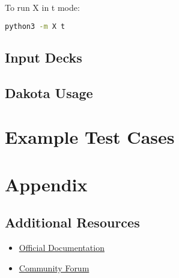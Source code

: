 \documentclass[a4paper,12pt]{article}
\begin{document}
To run X in t mode: 

\vspace{1em}  
\begin{lstlisting}[language=bash]  
    python3 -m X t 
\end{lstlisting}  
\vspace{1em}  

\subsection{Input Decks}

\subsection{Dakota Usage}


\section{Example Test Cases}

\section{Appendix}
\subsection{Additional Resources}
\begin{itemize}
    \item \href{https://www.x.com/documentation}{Official Documentation}
    \item \href{https://www.x.com/forum}{Community Forum}
\end{itemize}
\end{document}

